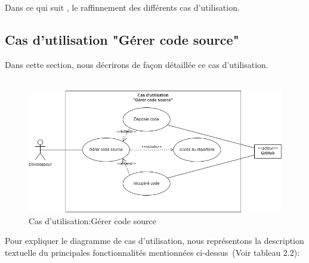 Dans ce qui suit , le raffinnement des différents cas d'utilisation.\\[0.2cm]
\subsection{\Large Cas d’utilisation "Gérer code source"}
Dans cette section, nous décrirons de façon détaillée ce cas d'utilisation.\\\texttt{}\\[0.01cm]

\begin{figure}[H]
  \begin{center}
  
      \includegraphics[width=15cm]{usecase1.drawio.png}

  \end{center}
  
  \caption{Cas d'utilisation:Gérer code source }
\end{figure}

Pour expliquer  le diagramme de cas d’utilisation, nous représentons la description textuelle du principales fonctionnalités mentionnées ci-dessus (Voir tableau 2.2): \\

